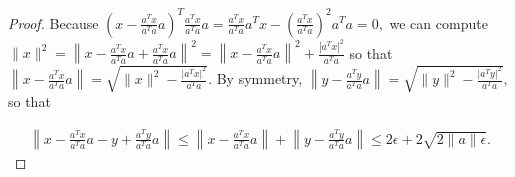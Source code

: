 \begin{proof}
Because
$
\left(x - \frac{a^Tx}{a^Ta} a\right)^T \frac{a^Tx}{a^Ta} a = \frac{a^Tx}{a^Ta} a^Tx - \left(\frac{a^Tx}{a^Ta}\right)^2a^Ta = 0,
$
we can compute
$
\|x\|^2 = \left\|x - \frac{a^Tx}{a^Ta} a + \frac{a^Tx}{a^Ta} a\right\|^2 = \left\|x - \frac{a^Tx}{a^Ta} a \right\|^2 +\frac{\left|a^Tx\right|^2}{a^Ta}
$
so that 
$
\left\|x - \frac{a^Tx}{a^Ta} a \right\| = \sqrt{\|x\|^2 - \frac{\left|a^Tx\right|^2}{a^Ta}}.
$
By symmetry,
$
\left\|y - \frac{a^Ty}{a^Ta} a \right\| = \sqrt{\|y\|^2 - \frac{\left|a^Ty\right|^2}{a^Ta}},
$
so that

\begin{align*}
\left\|x - \frac{a^Tx}{a^Ta} a - y + \frac{a^Ty}{a^Ta} a \right\|
\le \left\|x - \frac{a^Tx}{a^Ta} a \right\| + \left\|y - \frac{a^Ty}{a^Ta} a \right\|
\le 2\epsilon + 2\sqrt{2\|a\|\epsilon}.
\end{align*}




\end{proof}
